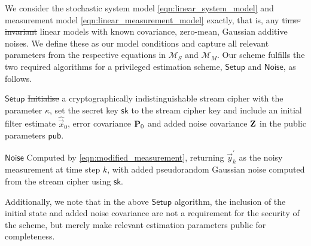 \documentclass[letterpaper, 10 pt, conference]{ieeeconf}
\providecommand{\DIFadd}[1]{{\protect\color{blue}\uwave{#1}}} %
\providecommand{\DIFdel}[1]{{\protect\color{red}\sout{#1}}}                      %
\providecommand{\DIFaddbegin}{} %
\providecommand{\DIFaddend}{} %
\providecommand{\DIFdelbegin}{} %
\providecommand{\DIFdelend}{} %
\newcommand{\DIFscaledelfig}{0.5}
\newlength{\DIFdelgraphicswidth} %
\newlength{\DIFdelgraphicsheight} %
\newcommand{\DIFaddincludegraphics}[2][]{{\color{blue}\fbox{\DIFOincludegraphics[#1]{#2}}}} %
\newcommand{\DIFdelincludegraphics}[2][]{%
\sbox{\DIFdelgraphicsbox}{\DIFOincludegraphics[#1]{#2}}%
\settoboxwidth{\DIFdelgraphicswidth}{\DIFdelgraphicsbox} %
\settoboxtotalheight{\DIFdelgraphicsheight}{\DIFdelgraphicsbox} %
\scalebox{\DIFscaledelfig}{%
\parbox[b]{\DIFdelgraphicswidth}{\usebox{\DIFdelgraphicsbox}\\[-\baselineskip] \rule{\DIFdelgraphicswidth}{0em}}\llap{\resizebox{\DIFdelgraphicswidth}{\DIFdelgraphicsheight}{%
\setlength{\unitlength}{\DIFdelgraphicswidth}%
\begin{picture}(1,1)%
\thicklines\linethickness{2pt} %
{\color[rgb]{1,0,0}\put(0,0){\framebox(1,1){}}}%
{\color[rgb]{1,0,0}\put(0,0){\line( 1,1){1}}}%
{\color[rgb]{1,0,0}\put(0,1){\line(1,-1){1}}}%
\end{picture}%
}\hspace*{3pt}}} %
} %
\DeclareRobustCommand{\DIFaddbegin}{\DIFOaddbegin \let\includegraphics\DIFaddincludegraphics} %
\DeclareRobustCommand{\DIFaddend}{\DIFOaddend \let\includegraphics\DIFOincludegraphics} %
\DeclareRobustCommand{\DIFdelbegin}{\DIFOdelbegin \let\includegraphics\DIFdelincludegraphics} %
\DeclareRobustCommand{\DIFdelend}{\DIFOaddend \let\includegraphics\DIFOincludegraphics} %
\begin{document}
We consider the stochastic system model \eqref{eqn:linear_system_model} and measurement model \eqref{eqn:linear_measurement_model} exactly, that is, any \DIFdelbegin \DIFdel{time-invariant }\DIFdelend linear models with known covariance, zero-mean, Gaussian additive noises. We define these as our model conditions and capture all relevant parameters from the respective equations in $\mathcal{M}_S$ and $\mathcal{M}_M$. Our scheme fulfills the two required algorithms for a privileged estimation scheme, $\mathsf{Setup}$ and $\mathsf{Noise}$, as follows.
\begin{LaTeXdescription}
   \item[$\mathsf{Setup}$] \DIFdelbegin \DIFdel{Initialise }\DIFdelend \DIFaddbegin \DIFadd{Initialize }\DIFaddend a cryptographically indistinguishable stream cipher with the parameter $\kappa$, set the secret key $\mathsf{sk}$ to the stream cipher key and include an initial filter estimate $\hat{\vec{x}}_0$, error covariance ${{\mathbf{P}}}_0$ and added noise covariance ${{\mathbf{Z}}}$ in the public parameters $\mathsf{pub}$.
   \item[$\mathsf{Noise}$] Computed by \eqref{eqn:modified_measurement}, returning $\vec{y}^\prime_k$ as the noisy measurement at time step $k$, with added pseudorandom Gaussian noise computed from the stream cipher using $\mathsf{sk}$.
\end{LaTeXdescription}
Additionally, we note that in the above $\mathsf{Setup}$ algorithm, the inclusion of the initial state and added noise covariance are not a requirement for the security of the scheme, but merely make relevant estimation parameters public for completeness.
\end{document}
